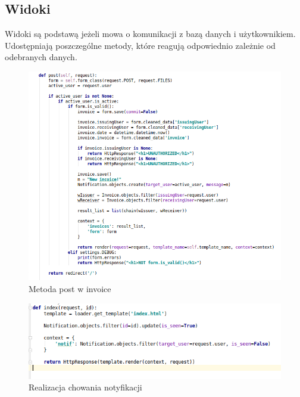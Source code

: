 \documentclass[12pt]{article}
\begin{document}
\subsection{Widoki}
Widoki są podstawą jeżeli mowa o komunikacji z bazą danych i użytkownikiem. Udostępniają poszczególne metody, które reagują odpowiednio zależnie od odebranych danych.
\begin{figure}[H]
	\centering
	\includegraphics[scale=0.7]{img/c_invoice_post.png}
	\caption{Metoda post w invoice}
\end{figure}
\begin{figure}[H]
	\centering
	\includegraphics[scale=0.7]{img/c_notify_view.png}
	\caption{Realizacja chowania notyfikacji}
\end{figure}
\end{document}
